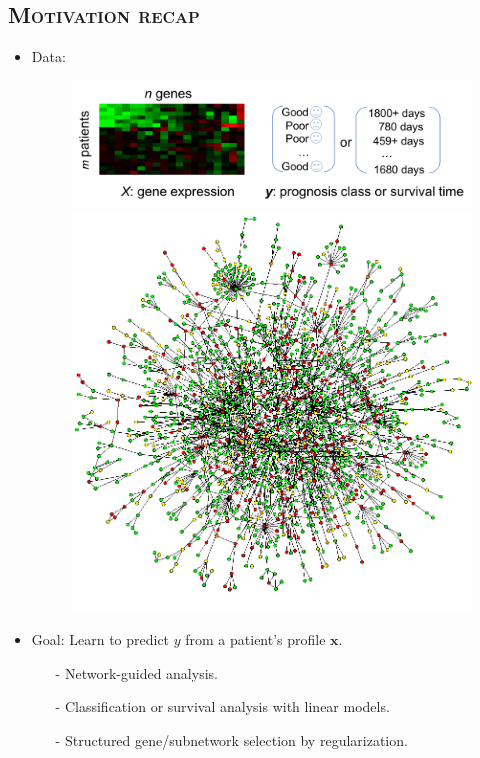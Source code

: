 \documentclass[xcolor=x11names,compress]{beamer}
\theoremstyle{plain}
\renewcommand{\(}{\begin{columns}}
\renewcommand{\)}{\end{columns}}
\newcommand{\<}[1]{\begin{column}{#1}}
\renewcommand{\>}{\end{column}}
\begin{document}
\subsection{\scshape Motivation recap}
\begin{frame}{\insertsubsection}
	
	\begin{itemize}
		\item Data: 
		\begin{figure}
			\centering
			\includegraphics[width=0.7\linewidth]{slides/prognosis}%
			\hskip 0.1cm%
			\includegraphics[width=0.25\linewidth]{slides/ppi}
		\end{figure}
		
		\item Goal: Learn to predict $y$ from a patient's profile $\mathbf{x}$.
		\begin{itemize}
			\item[-] Network-guided analysis.
			\item[-] Classification or survival analysis with linear models.
			\item[-] Structured gene/subnetwork selection by regularization.
		\end{itemize}
	\end{itemize}
	
\end{frame}
\end{document}
